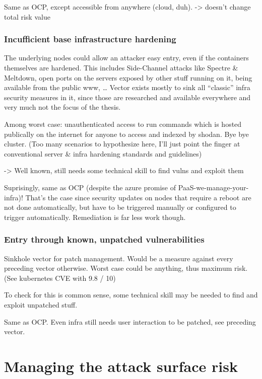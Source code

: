 Same as OCP, except accessible from anywhere (cloud, duh).
-> doesn’t change total risk value

\subsection{Incufficient base infrastructure hardening}
The underlying nodes could allow an attacker easy entry, even if the containers themselves are hardened. This includes Side-Channel attacks like Spectre & Meltdown, open ports on the servers exposed by other stuff running on it, being available from the public www, …
Vector exists mostly to sink all “classic” infra security measures in it, since those are researched and available everywhere and very much not the focus of the thesis.

Among worst case: unauthenticated access to run commands which is hosted publically on the internet for anyone to access and indexed by shodan. Bye bye cluster.
(Too many scenarios to hypothesize here, I’ll just point the finger at conventional server & infra hardening standards and guidelines)

-> Well known, still needs some technical skill to find vulns and exploit them

Suprisingly, same as OCP (despite the azure promise of PaaS-we-manage-your-infra)!
That’s the case since security updates on nodes that require a reboot are not done automatically, but have to be triggered manually or configured to trigger automatically.
Remediation is far less work though.

\subsection{Entry through known, unpatched vulnerabilities}
Sinkhole vector for patch management. Would be a measure against every preceding vector otherwise.
Worst case could be anything, thus maximum risk. (See kubernetes CVE with 9.8 / 10)

To check for this is common sense, some technical skill may be needed to find and exploit unpatched stuff.

Same as OCP. Even infra still needs user interaction to be patched, see preceding vector.

\chapter{Managing the attack surface risk}

